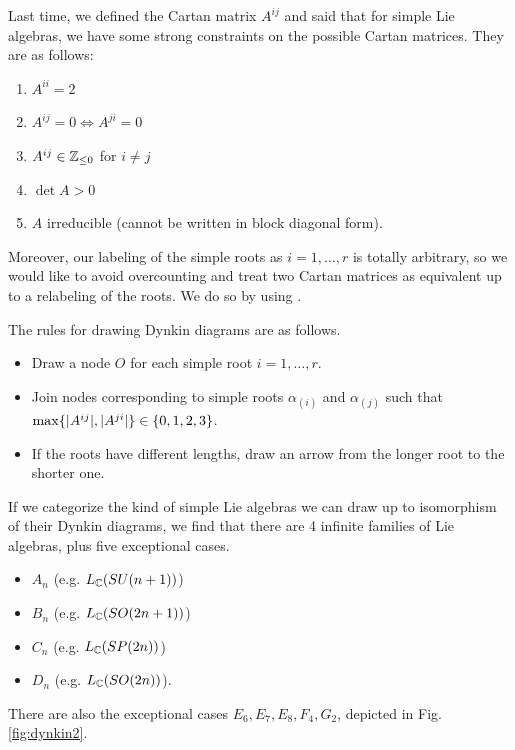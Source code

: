 Last time, we defined the Cartan matrix $A^{ij}$ and said that for simple Lie algebras, we have some strong constraints on the possible Cartan matrices. They are as follows:
\begin{enumerate}
    \item $A^{ii}=2$
    \item $A^{ij}=0\iff A^{ji}=0$
    \item $A^{ij}\in \mathbb{Z}_{\leq 0}$ for $i\neq j$
    \item $\det A >0$
    \item $A$ irreducible (cannot be written in block diagonal form).
\end{enumerate}

Moreover, our labeling of the simple roots as $i=1,\ldots,r$ is totally arbitrary, so we would like to avoid overcounting and treat two Cartan matrices as equivalent up to a relabeling of the roots. We do so by using .

The rules for drawing Dynkin diagrams are as follows.
\begin{itemize}
    \item Draw a node $O$ for each simple root $i=1,\ldots,r$.
    \item Join nodes corresponding to simple roots $\alpha_{(i)}$ and $\alpha_{(j)}$ such that $\max\{|A^{ij}|,|A^{ji}|\}\in \{0,1,2,3\}$.
    \item If the roots have different lengths, draw an arrow from the longer root to the shorter one.
\end{itemize}

If we categorize the kind of simple Lie algebras we can draw up to isomorphism of their Dynkin diagrams, we find that there are 4 infinite families of Lie algebras, plus five exceptional cases.
\begin{itemize}
    \item $A_n$ (e.g. $L_{\mathbb{C}}(SU(n+1))$)
    \item $B_n$ (e.g. $L_{\mathbb{C}}(SO(2n+1))$)
    \item $C_n$ (e.g. $L_{\mathbb{C}}(SP(2n))$)
    \item $D_n$ (e.g. $L_{\mathbb{C}}(SO(2n))$).
\end{itemize}
There are also the exceptional cases $E_6,E_7,E_8,F_4,G_2$, depicted in Fig. \ref{fig:dynkin2}.

